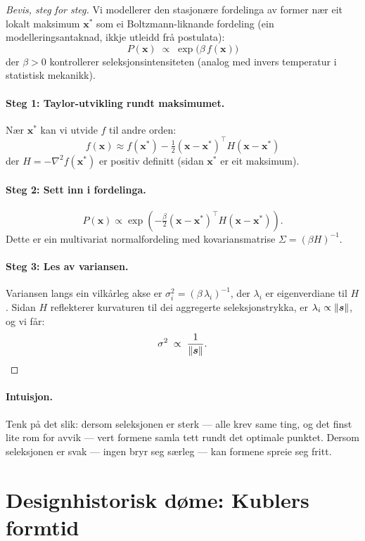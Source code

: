 \begin{proof}[Bevis, steg for steg]
Vi modellerer den stasjonære fordelinga av former nær eit
lokalt maksimum $\bm{x}^*$ som ei Boltzmann-liknande fordeling
(ein modelleringsantaknad, ikkje utleidd frå postulata):
\[
  P(\bm{x}) \;\propto\;
  \exp\!\bigl(\beta \, f(\bm{x})\bigr)
\]
der $\beta > 0$ kontrollerer seleksjonsintensiteten (analog med
invers temperatur i statistisk mekanikk).

\paragraph{Steg 1: Taylor-utvikling rundt maksimumet.}
Nær $\bm{x}^*$ kan vi utvide $f$ til andre orden:
\[
  f(\bm{x}) \approx f(\bm{x}^*)
  - \tfrac{1}{2}
  (\bm{x} - \bm{x}^*)^\top H (\bm{x} - \bm{x}^*)
\]
der $H = -\nabla^2 f(\bm{x}^*)$ er positiv definitt
(sidan $\bm{x}^*$ er eit maksimum).

\paragraph{Steg 2: Sett inn i fordelinga.}
\[
  P(\bm{x}) \propto \exp\!\left(
    -\tfrac{\beta}{2}
    (\bm{x} - \bm{x}^*)^\top H
    (\bm{x} - \bm{x}^*)
  \right).
\]
Dette er ein multivariat normalfordeling med kovariansmatrise
$\Sigma = (\beta H)^{-1}$.

\paragraph{Steg 3: Les av variansen.}
Variansen langs ein vilkårleg akse er
$\sigma_i^2 = (\beta \, \lambda_i)^{-1}$, der $\lambda_i$ er
eigenverdiane til $H$. Sidan $H$ reflekterer kurvaturen til dei
aggregerte seleksjonstrykka, er $\lambda_i \propto \lVert \bm{s} \rVert$,
og vi får:
\[
  \sigma^2 \;\propto\; \frac{1}{\lVert \bm{s} \rVert}. \qedhere
\]
\end{proof}

\paragraph{Intuisjon.}
Tenk på det slik: dersom seleksjonen er sterk --- alle krev same
ting, og det finst lite rom for avvik --- vert formene samla tett
rundt det optimale punktet. Dersom seleksjonen er svak --- ingen
bryr seg særleg --- kan formene spreie seg fritt.


\section{Designhistorisk døme: Kublers formtid}

